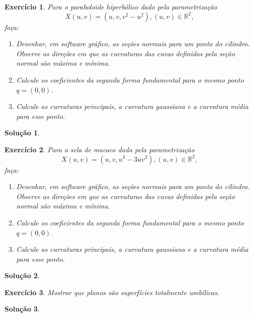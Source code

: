 \documentclass[a4paper,12pt]{article}
\newcommand{\R}{\mathbb{R}}
\theoremstyle{exer}
\newtheorem{exercise}{Exercício}
\theoremstyle{definition}
\newtheorem{solution}{Solução}
\theoremstyle{plain}
\begin{document}
\begin{exercise}
    Para o paraboloide hiperbólico dado pela parametrização $$X(u, v) = (u, v,
    v^2 - u^2), (u, v) \in \R^2,$$ faça:
    \begin{enumerate}
        \item[(a)] Desenhar, em software gráfico, as seções normais para um
        ponto do cilindro. Observe as direções em que as curvaturas das cuvas
        definidas pela seção normal são máxima e mínima. 
        \item[(b)] Calcule os coeficientes da segunda forma fundamental para o
        mesmo ponto $q = (0, 0)$.  
        \item[(c)] Calcule as curvaturas principais, a curvatura gaussiana e a
        curvatura média para esse ponto.
    \end{enumerate}
\end{exercise}

\begin{solution}

\end{solution}

\begin{exercise}
    Para a sela de macaco dada pela parametrização 
    $$X(u, v) = (u, v,
    u^3- 3uv^2), (u, v) \in \R^2,$$ faça:
    \begin{enumerate}
        \item[(a)] Desenhar, em software gráfico, as seções normais para um ponto do cilindro.
        Observe as direções em que as curvaturas das cuvas definidas pela seção normal
        são máxima e mínima.
        \item[(b)] Calcule os coeficientes da segunda forma fundamental para o mesmo ponto $q =
        (0, 0)$.
        \item[(c)] Calcule as curvaturas principais, a curvatura gaussiana e a curvatura média para
        esse ponto.
    \end{enumerate}
\end{exercise}

\begin{solution}
    
\end{solution}

\begin{exercise}
    Mostrar que planos são superfícies totalmente umbílicas.
\end{exercise}

\begin{solution}
    
\end{solution}
\end{document}
